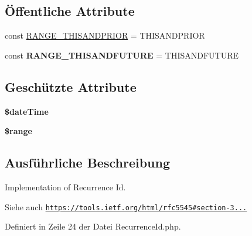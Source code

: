 \subsection*{Öffentliche Attribute}
\begin{DoxyCompactItemize}
\item 
const \mbox{\hyperlink{class_eluceo_1_1i_cal_1_1_property_1_1_event_1_1_recurrence_id_a32c13b95be95c9f7d54f1da8679d3cea}{R\+A\+N\+G\+E\+\_\+\+T\+H\+I\+S\+A\+N\+D\+P\+R\+I\+OR}} = \textquotesingle{}T\+H\+I\+S\+A\+N\+D\+P\+R\+I\+OR\textquotesingle{}
\item 
\mbox{\label{class_eluceo_1_1i_cal_1_1_property_1_1_event_1_1_recurrence_id_ab21009983b81dbfc87f6e7ea93901b3a}} 
const {\bfseries R\+A\+N\+G\+E\+\_\+\+T\+H\+I\+S\+A\+N\+D\+F\+U\+T\+U\+RE} = \textquotesingle{}T\+H\+I\+S\+A\+N\+D\+F\+U\+T\+U\+RE\textquotesingle{}
\end{DoxyCompactItemize}
\subsection*{Geschützte Attribute}
\begin{DoxyCompactItemize}
\item 
\mbox{\label{class_eluceo_1_1i_cal_1_1_property_1_1_event_1_1_recurrence_id_ae0e11aee8a15b539fa3b6b6b5646272f}} 
{\bfseries \$date\+Time}
\item 
\mbox{\label{class_eluceo_1_1i_cal_1_1_property_1_1_event_1_1_recurrence_id_a8c20c343d8c072abb480c079155254b4}} 
{\bfseries \$range}
\end{DoxyCompactItemize}


\subsection{Ausführliche Beschreibung}
Implementation of Recurrence Id.

\begin{DoxySeeAlso}{Siehe auch}
\href{https://tools.ietf.org/html/rfc5545#section-3.8.4.4}{\tt https\+://tools.\+ietf.\+org/html/rfc5545\#section-\/3...} 
\end{DoxySeeAlso}


Definiert in Zeile 24 der Datei Recurrence\+Id.\+php.



